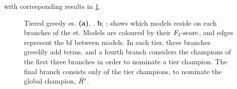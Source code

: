 with corresponding results in \cref{fig:example_es_tiered_greedy}. 
\begin{figure}[H]
    \begin{center}
    \qquad
    \end{center}
    \caption[Tiered greedy exploration strategy]{
        Tiered greedy \acrlong{es}. 
        \textbf{(a)}, . 
        \textbf{b}, : shows which models reside on each branches of the \acrlong{et}. 
        Models are coloured by their $ F_{1}\text{-score} $, and edges represent the \gls{bf} between models. 
        In each tier, three branches greedily add terms, and a fourth branch considers the champions of the first three branches
        in order to nominate a tier champion. 
        The final branch consists only of the tier champions, to nominate the global champion, $\hat{H}^{\prime}$.  
    }
    \label{fig:example_es_tiered_greedy}
\end{figure}

